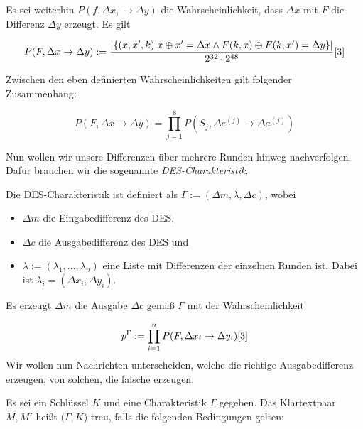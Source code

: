 \documentclass[
10pt, %
a4paper, %
oneside, %
headinclude,footinclude, %
BCOR5mm, %
]{scrartcl}
\begin{document}
\begin{1}[ht]
\begin{definition}
	\end{definition}

	\begin{definition}
	Es sei weiterhin $P(f, \Delta x, \rightarrow \Delta y)$ die Wahrscheinlichkeit, dass $\Delta x$ mit $F$ die Differenz $\Delta y$ erzeugt. Es gilt

	$$ P(F, \Delta x \rightarrow \Delta y) := 
		\frac{| \{ (x,x',k) | x \oplus x' = \Delta x 
		\wedge F(k,x) \oplus F(k,x') = \Delta y \} |}{2^{32} \cdot 2^{48}} 
	\cite[164-165]{3} $$

	\end{definition}


	\begin{theorem}
	Zwischen den eben definierten Wahrscheinlichkeiten gilt folgender Zusammenhang:

	$$ P(F, \Delta x \rightarrow \Delta y) =
		\prod_{j=1}^8{P(S_j, \Delta e^{(j)} \rightarrow \Delta a^{(j)})} $$

	\end{theorem}

	Nun wollen wir unsere Differenzen über mehrere Runden hinweg nachverfolgen. Dafür brauchen wir die sogenannte \emph{DES-Charakteristik}. 
	
	\begin{definition}
	Die DES-Charakteristik ist definiert als $\Gamma := (\Delta m, \lambda, \Delta c)$, wobei

	\begin{itemize}
	\item $\Delta m$ die Eingabedifferenz des DES,
	\item $\Delta c$ die Ausgabedifferenz des DES und
	\item $\lambda := (\lambda_1, \dots, \lambda_n)$ eine Liste mit Differenzen der einzelnen Runden ist. Dabei ist $\lambda_i = (\Delta x_i, \Delta y_i)$.
	\end{itemize}
	\end{definition}

	Es erzeugt $\Delta m$ die Ausgabe $\Delta c$ gemäß $\Gamma$ mit der Wahrscheinlichkeit

	$$ p^{\Gamma} := \prod_{i=1}^n{P(F, \Delta x_i \rightarrow \Delta y_i)} \cite[166-167]{3} $$
	Wir wollen nun Nachrichten unterscheiden, welche die richtige Ausgabedifferenz erzeugen, von solchen, die falsche erzeugen.

	\begin{definition}
	Es sei ein Schlüssel $K$ und eine Charakteristik $\Gamma$ gegeben. Das Klartextpaar $M, M'$ heißt $(\Gamma, K$)-treu, falls die folgenden Bedingungen gelten:


\end{definition}
\end{1}
\end{document}
